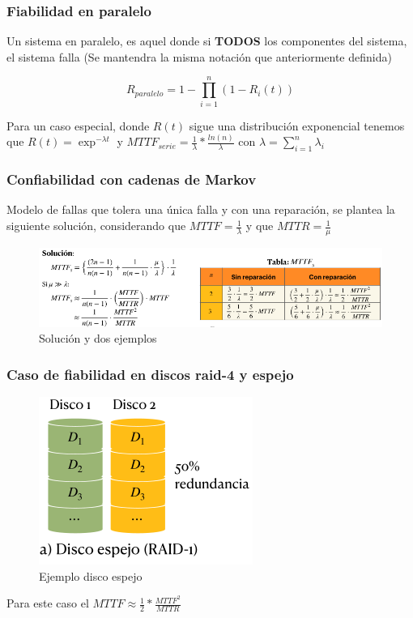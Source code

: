\subsubsection{Fiabilidad en paralelo}
Un sistema en paralelo, es aquel donde si \textbf{TODOS} los componentes del sistema, el sistema falla (Se mantendra la misma notación que anteriormente definida)

\[
    R_{paralelo}= 1 - \prod_{i=1}^{n} (1-R_i(t))
\]

Para un caso especial, donde $R(t)$ sigue una distribución exponencial tenemos que $R(t)=\exp^{-\lambda t}$ y $MTTF_{serie}= \frac{1}{\lambda}*\frac{ln(n)}{\lambda}$ con $\lambda= \sum_{i=1}^{n}\lambda_i $

\subsubsection{Confiabilidad con cadenas de Markov}
Modelo de fallas que tolera una única falla y con una reparación, se plantea la siguiente solución, considerando que $MTTF=\frac{1}{\lambda}$ y que $MTTR=\frac{1}{\mu}$
\begin{figure}[H]
    \centering
    \includegraphics[width=1.0\linewidth]{img/Markov.png}
    \caption{Solución y dos ejemplos}\label{fig:1761834118505}
\end{figure}

\subsubsection{Caso de fiabilidad en discos raid-4 y espejo}

\begin{figure}[H]
    \centering
    \includegraphics[width=1.0\linewidth]{img/Espejo.png}
    \caption{Ejemplo disco espejo}\label{fig:1761834250462}
\end{figure}
Para este caso el $MTTF\approx\frac{1}{2}*\frac{MTTF^2}{MTTR}$


